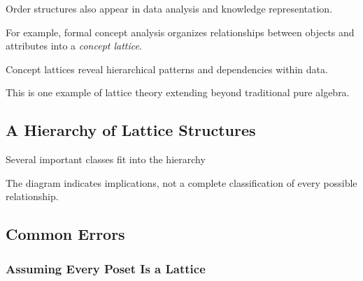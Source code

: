 Order structures also appear in data analysis and knowledge representation.

For example, formal concept analysis organizes relationships between
objects and attributes into a \emph{concept lattice}.

Concept lattices reveal hierarchical patterns and dependencies within data.

This is one example of lattice theory extending beyond traditional pure
algebra.

\subsection{A Hierarchy of Lattice Structures}
\label{subsec:lattice-hierarchy}

Several important classes fit into the hierarchy

\begin{center}
\end{center}

The diagram indicates implications, not a complete classification of every
possible relationship.

\subsection{Common Errors}
\label{subsec:lattice-common-errors}

\subsubsection{Assuming Every Poset Is a Lattice}

